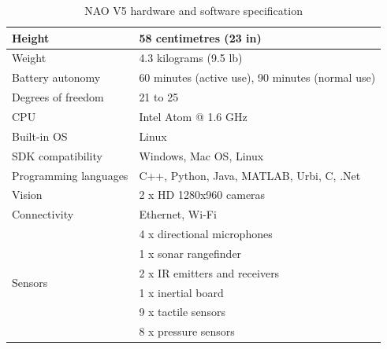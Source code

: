 \begin{table}
	[h] \centering \caption{NAO V5 hardware and software specification } \label{tb:nao} 
	\begin{tabular}
		{|l|l|} \hline Height & 58 centimetres (23 in) \\
		\hline Weight & 4.3 kilograms (9.5 lb) \\
		\hline Battery autonomy & 60 minutes (active use), 90 minutes (normal use) \\
		\hline Degrees of freedom & 21 to 25 \\
		\hline CPU & Intel Atom @ 1.6 GHz \\
		\hline Built-in OS & Linux \\
		\hline SDK compatibility & Windows, Mac OS, Linux \\
		\hline Programming languages & C++, Python, Java, MATLAB, Urbi, C, .Net \\
		\hline Vision & 2 x HD 1280x960 cameras \\
		\hline Connectivity & Ethernet, Wi-Fi \\
		\hline \multirow{6}{*}{Sensors} & 4 x directional microphones \\
		& 1 x sonar rangefinder \\
		& 2 x IR emitters and receivers \\
		& 1 x inertial board \\
		& 9 x tactile sensors \\
		& 8 x pressure sensors \\
		\hline 
	\end{tabular}
\end{table}

